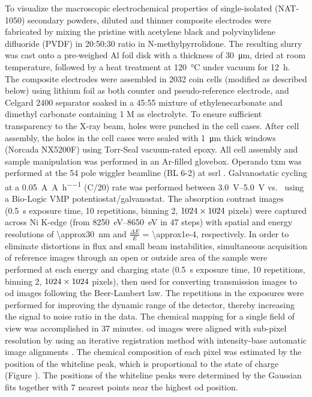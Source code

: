\documentclass{article}
\begin{document}
To visualize the macroscopic electrochemical properties of
single-isolated \nca{} (NAT-1050) secondary powders, diluted and
thinner composite electrodes were fabricated by mixing the pristine
\nca{} with acetylene black and polyvinylidene difluoride (PVDF) in
20:50:30 ratio in N-methylpyrrolidone. The resulting slurry was cast
onto a pre-weighed Al foil disk with a thickness of
\SI{30}{\micro\meter}, dried at room temperature, followed by a heat
treatment at \SI{120}{\celsius} under vacuum for \SI{12}{\hour}. The
composite electrodes were assembled in 2032 coin cells (modified as
described below) using lithium foil as both counter and
pseudo-reference electrode, and Celgard 2400 separator soaked in a
45:55 mixture of ethylenecarbonate and dimethyl carbonate containing 1
M  as electrolyte. To ensure sufficient transparency to the
X-ray beam, holes were punched in the cell cases. After cell assembly,
the holes in the cell cases were sealed with \SI{1}{\micro\meter}
thick  windows (Norcada NX5200F) using Torr-Seal
vacuum-rated epoxy. All cell assembly and sample manipulation was
performed in an Ar-filled glovebox. Operando \gls{txm} was performed
at the 54 pole wiggler beamline (BL 6-2) at \gls{ssrl}
\cite{yun2008}. Galvanostatic cycling at a
\SI{0.05}{\ampere\per\ampere\per\hour} (C/20) rate was performed
between \SIrange{3.0}{5.0}{\volt} vs.\  using a Bio-Logic
VMP potentiostat/galvanostat. The absorption contrast images
(\SI{0.5}{\second} exposure time, 10 repetitions, binning 2, $\rm
1024\times 1024$ pixels) were captured across Ni K-edge (from
\SIrange{8250}{8650}{\electronvolt} in 47 steps) with spatial and
energy resolutions of \SI{\approx30}{\nano\meter} and $\frac{\Delta
  E}{E}$ = \num{\approx1e-4}, respectively. In order to eliminate
distortions in flux and small beam instabilities, simultaneous
acquisition of reference images through an open or outside area of the
sample were performed at each energy and charging state
(\SI{0.5}{\second} exposure time, 10 repetitions, binning 2, $\rm 1024
\times 1024$ pixels), then used for converting transmission images to
\gls{od} images following the Beer-Lambert law. The repetitions in the
exposures were performed for improving the dynamic range of the
detector, thereby increasing the signal to noise ratio in the
data. The chemical mapping for a single field of view was accomplished
in 37 minutes. \Gls{od} images were aligned with sub-pixel resolution
by using an iterative registration method with intensity-base
automatic image alignments \cite{lee2019-3}. The chemical composition
of each pixel was estimated by the position of the whiteline peak,
which is proportional to the state of charge (Figure
). The positions of the whiteline
peaks were determined by the Gaussian fits together with 7 nearest
points near the highest \gls{od} position.
\end{document}
